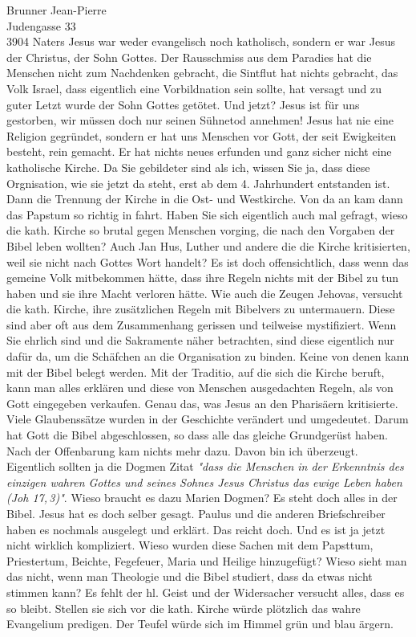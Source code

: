 \documentclass[
    12pt,
    a4paper,
    letter,
    parskip=yes,
    ]{scrlttr2}
\begin{document}
\begin{letter}{
Brunner Jean-Pierre\\
Judengasse 33\\
3904 Naters}
Jesus war weder evangelisch noch katholisch, sondern er war Jesus der Christus, der Sohn Gottes. Der Rausschmiss aus dem Paradies hat die Menschen nicht zum Nachdenken gebracht, die Sintflut hat nichts gebracht, das Volk Israel, dass eigentlich eine Vorbildnation sein sollte, hat versagt und zu guter Letzt wurde der Sohn Gottes getötet. Und jetzt? Jesus ist für uns gestorben, wir müssen doch nur seinen Sühnetod annehmen! Jesus hat nie eine Religion gegründet, sondern er hat uns Menschen vor Gott, der seit Ewigkeiten besteht, rein gemacht. Er hat nichts neues erfunden und ganz sicher nicht eine katholische Kirche. Da Sie gebildeter sind als ich, wissen Sie ja, dass diese Orgnisation, wie sie jetzt da steht, erst ab dem 4. Jahrhundert entstanden ist. Dann die Trennung der Kirche in die Ost- und Westkirche. Von da an kam dann das Papstum so richtig in fahrt. Haben Sie sich eigentlich auch mal gefragt, wieso die kath. Kirche so brutal gegen Menschen vorging, die nach den Vorgaben der Bibel leben wollten? Auch Jan Hus, Luther und andere die die Kirche kritisierten, weil sie nicht nach Gottes Wort handelt? Es ist doch offensichtlich, dass wenn das gemeine Volk mitbekommen hätte, dass ihre Regeln nichts mit der Bibel zu tun haben und sie ihre Macht verloren hätte. Wie auch die Zeugen Jehovas, versucht die kath. Kirche, ihre zusätzlichen Regeln mit Bibelvers zu untermauern. Diese sind aber oft aus dem Zusammenhang gerissen und teilweise mystifiziert. Wenn Sie ehrlich sind und die Sakramente näher betrachten, sind diese eigentlich nur dafür da, um die Schäfchen an die Organisation zu binden. Keine von denen kann mit der Bibel belegt werden. Mit der Traditio, auf die sich die Kirche beruft, kann man alles erklären und diese von Menschen ausgedachten Regeln, als von Gott eingegeben verkaufen. Genau das, was Jesus an den Pharisäern kritisierte. Viele Glaubenssätze wurden in der Geschichte verändert und umgedeutet. Darum hat Gott die Bibel abgeschlossen, so dass alle das gleiche Grundgerüst haben. Nach der Offenbarung kam nichts mehr dazu. Davon bin ich überzeugt. Eigentlich sollten ja die Dogmen Zitat \textit{"dass die Menschen in der Erkenntnis des einzigen wahren Gottes und seines Sohnes Jesus Christus das ewige Leben haben (Joh 17,\,3)"}. Wieso braucht es dazu Marien Dogmen? Es steht doch alles in der Bibel. Jesus hat es doch selber gesagt. Paulus und die anderen Briefschreiber haben es nochmals ausgelegt und erklärt. Das reicht doch. Und es ist ja jetzt nicht wirklich kompliziert. Wieso wurden diese Sachen mit dem Papsttum, Priestertum, Beichte, Fegefeuer, Maria und Heilige hinzugefügt? Wieso sieht man das nicht, wenn man Theologie und die Bibel studiert, dass da etwas nicht stimmen kann? Es fehlt der hl. Geist und der Widersacher versucht alles, dass es so bleibt. Stellen sie sich vor die kath. Kirche würde plötzlich das wahre Evangelium predigen. Der Teufel würde sich im Himmel grün und blau ärgern.



\end{letter}
\end{document}

